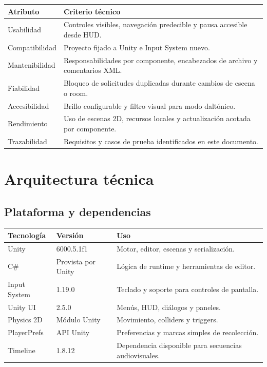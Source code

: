 \documentclass[11pt,a4paper,oneside]{report}
\newcommand{\code}[1]{\texttt{\detokenize{#1}}}
\begin{document}
\begin{tabularx}{\textwidth}{L{0.24\textwidth} Y}
  \toprule
  \color{white}\textbf{Atributo} & \color{white}\textbf{Criterio técnico} \\
  \midrule
  Usabilidad & Controles visibles, navegación predecible y pausa accesible desde HUD. \\
  Compatibilidad & Proyecto fijado a Unity \code{6000.5.1f1} e Input System nuevo. \\
  Mantenibilidad & Responsabilidades por componente, encabezados de archivo y comentarios XML. \\
  Fiabilidad & Bloqueo de solicitudes duplicadas durante cambios de escena o room. \\
  Accesibilidad & Brillo configurable y filtro visual para modo daltónico. \\
  Rendimiento & Uso de escenas 2D, recursos locales y actualización acotada por componente. \\
  Trazabilidad & Requisitos y casos de prueba identificados en este documento. \\
  \bottomrule
\end{tabularx}

\chapter{Arquitectura técnica}

\section{Plataforma y dependencias}

\begin{tabularx}{\textwidth}{L{0.30\textwidth} L{0.22\textwidth} Y}
  \toprule
  \color{white}\textbf{Tecnología} & \color{white}\textbf{Versión} & \color{white}\textbf{Uso} \\
  \midrule
  Unity & 6000.5.1f1 & Motor, editor, escenas y serialización. \\
  C\# & Provista por Unity & Lógica de runtime y herramientas de editor. \\
  Input System & 1.19.0 & Teclado y soporte para controles de pantalla. \\
  Unity UI & 2.5.0 & Menús, HUD, diálogos y paneles. \\
  Physics 2D & Módulo Unity & Movimiento, colliders y triggers. \\
  PlayerPrefs & API Unity & Preferencias y marcas simples de recolección. \\
  Timeline & 1.8.12 & Dependencia disponible para secuencias audiovisuales. \\
  \bottomrule
\end{tabularx}
\end{document}
